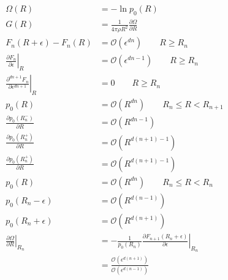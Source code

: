 \documentclass[11pt]{report}
\begin{document}
\begin{subequations}
  \begin{align}
    \Omega(R) &= - \ln{p_0(R)} \\
    G(R) &=
    \frac{1}{4\pi \rho R^2}
    \frac{\partial \Omega}{\partial R} \\
    F_n(R + \epsilon) - F_n(R) &=
    \mathcal{O}(\epsilon^{dn})
    \qquad R \ge R_n \\
    \left. \frac{\partial F_n}{\partial \epsilon} \right|_R &=
    \mathcal{O}(\epsilon^{dn-1})
    \qquad R \ge R_n \\
    \left. \frac{\partial^{dn+1} F_n}{\partial \epsilon^{dn+1}} \right|_R &=
    0
    \qquad R \ge R_n \\
    p_0(R) &= \mathcal{O}(R^{dn}) \qquad R_n \le R < R_{n+1} \\
    \frac{\partial p_0(R_n^-)}{\partial R} &=
    \mathcal{O}(R^{dn-1}) \\
    \frac{\partial p_0(R_n^+)}{\partial R} &=
    \mathcal{O}(R^{d(n+1)-1}) \\
    \frac{\partial p_0(R_n^+)}{\partial R} &=
    \mathcal{O}(R^{d(n+1)-1}) \\
    p_0(R) &= \mathcal{O}(R^{dn}) \qquad R_n \le R < R_n \\
    p_0(R_n - \epsilon) &= \mathcal{O}(R^{d(n-1)}) \\
    p_0(R_n + \epsilon) &= \mathcal{O}(R^{d(n+1)}) \\
    \left. \frac{\partial \Omega}{\partial R} \right|_{R_n} &=
    -\frac{1}{p_0(R_n)}
    \left. \frac{\partial F_{n+1}(R_n + \epsilon)}{\partial \epsilon} \right|_{R_n}
    \\
    &=
    \frac{\mathcal{O}(\epsilon^{d(n+1)})}{\mathcal{O}(\epsilon^{d(n-1)})}
  \end{align}
\end{subequations}
\end{document}
